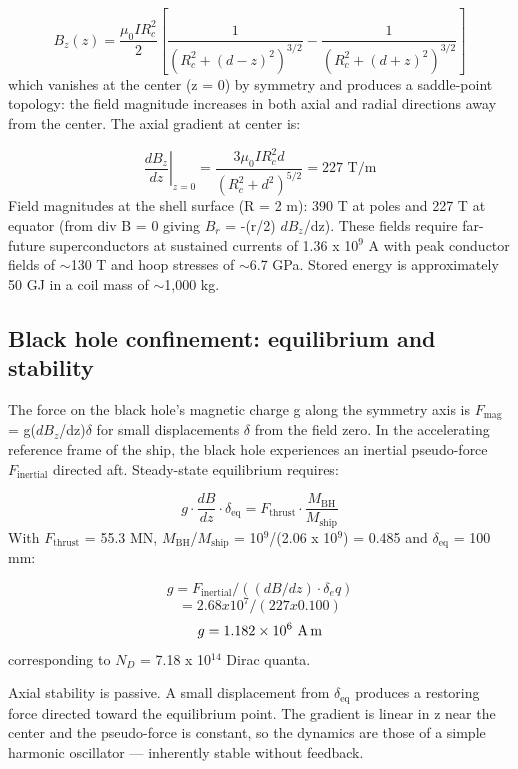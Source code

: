 \documentclass[12pt,a4paper]{article}
\begin{document}
\begin{equation}
B_z(z) = \frac{\mu_0 I R_c^2}{2} \left[ \frac{1}{(R_c^2 + (d-z)^2)^{3/2}} - \frac{1}{(R_c^2 + (d+z)^2)^{3/2}} \right]
\end{equation}
which vanishes at the center (z = 0) by symmetry and produces a saddle-point topology: the field magnitude increases in both axial and radial directions away from the center. The axial gradient at center is:

\begin{equation}
\left.\frac{dB_z}{dz}\right|_{z=0} = \frac{3\mu_0 I R_c^2 d}{(R_c^2 + d^2)^{5/2}} = 227 \text{ T/m}
\end{equation}
Field magnitudes at the shell surface (R = 2 m): 390 T at poles and 227 T at equator (from div B = 0 giving $B_r$ = -(r/2) $dB_z$/dz). These fields require far-future superconductors at sustained currents of 1.36 x 10$^{9}$ A with peak conductor fields of $\sim$130 T and hoop stresses of $\sim$6.7 GPa. Stored energy is approximately 50 GJ in a coil mass of $\sim$1,000 kg.

\subsection{Black hole confinement: equilibrium and stability}
The force on the black hole's magnetic charge g along the symmetry axis is $F_{\text{mag}}$ = g($dB_z$/dz)$\delta$ for small displacements $\delta$ from the field zero. In the accelerating reference frame of the ship, the black hole experiences an inertial pseudo-force $F_{\text{inertial}}$ directed aft. Steady-state equilibrium requires:

\begin{equation}
g \cdot \frac{dB}{dz} \cdot \delta_\text{eq} = F_\text{thrust} \cdot \frac{M_\text{BH}}{M_\text{ship}}
\end{equation}
With $F_{\text{thrust}}$ = 55.3 MN, $M_{\text{BH}}$/$M_{\text{ship}}$ = 10$^{9}$/(2.06 x 10$^{9}$) = 0.485 and $\delta_{\text{eq}}$ = 100 mm:

\[
g = F_{\text{inertial}}/((dB/dz) \cdot \delta{}_eq)
\]
\[
= 2.68 x 10^{7}/(227 x 0.100)
\]
\begin{equation}
g = 1.182 \times 10^6 \text{ A\,m}
\end{equation}
corresponding to $N_D$ = 7.18 x 10$^{14}$ Dirac quanta.

Axial stability is passive. A small displacement from $\delta_{\text{eq}}$ produces a restoring force directed toward the equilibrium point. The gradient is linear in z near the center and the pseudo-force is constant, so the dynamics are those of a simple harmonic oscillator --- inherently stable without feedback.
\end{document}
